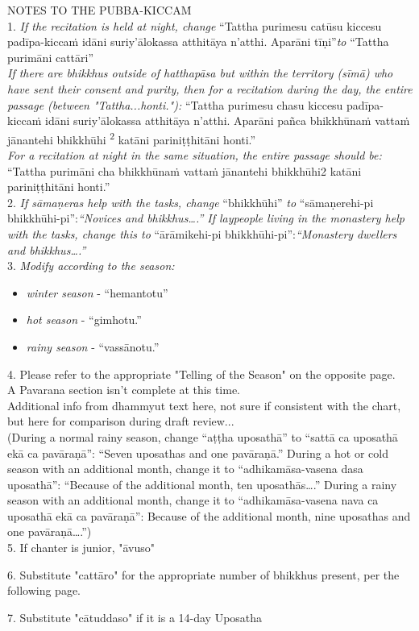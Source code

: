 NOTES TO THE PUBBA-KICCAṀ\\

1.  {\itshape If the recitation is held at night, change }“Tattha purimesu catūsu kiccesu padīpa-kiccaṁ idāni suriy’ālokassa atthitāya n’atthi. Aparāni tīṇi”{\itshape  to }“Tattha purimāni cattāri”\\

 {\itshape If there are bhikkhus outside of hatthapāsa but within the territory (sīmā) who have sent their consent and purity, then for a recitation during the day, the entire passage (between "Tattha...honti."): } “Tattha purimesu chasu kiccesu padīpa-kiccaṁ idāni suriy’ālokassa atthitāya n’atthi. Aparāni pañca
bhikkhūnaṁ vattaṁ jānantehi bhikkhūhi \textsuperscript{2} katāni pariniṭṭhitāni honti.”\\

{\itshape For a recitation at night in the same situation, the entire passage should be:}\\
“Tattha purimāni cha bhikkhūnaṁ vattaṁ jānantehi bhikkhūhi2 katāni pariniṭṭhitāni honti.”\\

2. {\itshape If sāmaṇeras help with the tasks, change} “bhikkhūhi” {\itshape to }“sāmaṇerehi-pi bhikkhūhi-pi”:{\itshape “Novices and bhikkhus….” If laypeople living in the monastery help with the tasks, change this to }“ārāmikehi-pi bhikkhūhi-pi”:{\itshape “Monastery dwellers and bhikkhus….”}\\


3. {\itshape Modify according to the season:}
\begin{itemize}[leftmargin=24pt, font=\scriptsize]
\item{\itshape winter season} - “hemantotu” 
\item{\itshape hot season} - “gimhotu.”
\item{\itshape rainy season} - “vassānotu.”
\end{itemize}

4. Please refer to the appropriate "Telling of the Season" on the opposite page.\\
A Pavarana section isn't complete at this time.\\
Additional info from dhammyut text here, not sure if consistent with the chart, but here for comparison during draft review...\\

(During a normal rainy season, change “aṭṭha uposathā” to “sattā ca uposathā ekā ca pavāraṇā”: “Seven uposathas and one pavāraṇā.”
During a hot or cold season with an additional month, change it to “adhikamāsa-vasena dasa uposathā”: “Because of the additional month, ten uposathās….”
During a rainy season with an additional month, change it to “adhikamāsa-vasena nava ca uposathā ekā ca pavāraṇā”: Because of the additional month, nine uposathas and one pavāraṇā….”)\\

5. If chanter is junior, "āvuso"

6. Substitute "cattāro" for the appropriate number of bhikkhus present, per the following page.

7. Substitute "cātuddaso" if it is a 14-day Uposatha


